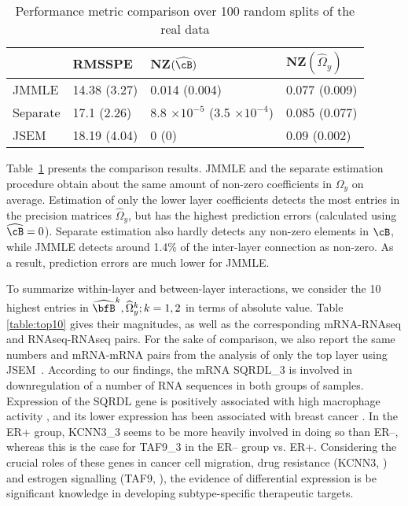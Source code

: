 \begin{table}[t]
\centering
    \begin{tabular}{llll}
    \hline
~        & RMSSPE        & NZ$(\widehat \cB)$  & NZ$(\widehat \Omega_y)$  \\\hline
JMMLE    & 14.38 (3.27) & 0.014 (0.004) & 0.077 (0.009) \\
Separate & 17.1 (2.26)  & 8.8 $\times 10^{-5}$ (3.5 $\times 10^{-4}$) & 0.085 (0.077) \\
JSEM     & 18.19 (4.04) & 0 (0)             & 0.09 (0.002) \\\hline
    \end{tabular}
    \caption{Performance metric comparison over 100 random splits of the real data}
    \label{table:real-compare}
\end{table}
%
Table~\ref{table:real-compare} presents the comparison results. JMMLE and the separate estimation procedure obtain about the same amount of non-zero coefficients in $\Omega_y$ on average. Estimation of only the lower layer coefficients detects the most entries in the precision matrices $\widehat \Omega_y$, but has the highest prediction errors (calculated using $\widehat \cB = 0$). Separate estimation also hardly detects any non-zero elements in $\cB$, while JMMLE detects around 1.4\% of the inter-layer connection as non-zero. As a result, prediction errors are much lower for JMMLE.

To summarize within-layer and between-layer interactions, we consider the 10 highest entries in $\widehat \bfB^k, \widehat \Omega_y^k; k = 1,2$ in terms of absolute value. Table \ref{table:top10} gives their magnitudes, as well as the corresponding mRNA-RNAseq and RNAseq-RNAseq pairs. For the sake of comparison, we also report the same numbers and mRNA-mRNA pairs from the analysis of only the top layer using JSEM~\citep{MaMichailidis15}. According to our findings, the mRNA SQRDL\_3 is involved in downregulation of a number of RNA sequences in both groups of samples. Expression of the SQRDL gene is positively associated with high macrophage activity \citep{LyonsEtal17}, and its lower expression has been associated with breast cancer \citep{LiuEtal07,PiresEtal18}. In the ER+ group, KCNN3\_3 seems to be more heavily involved in doing so than ER--, whereas this is the case for TAF9\_3 in the ER-- group vs. ER+. Considering the crucial roles of these genes in cancer cell migration, drug resistance (KCNN3, \citet{kcnn3}) and estrogen signalling (TAF9, \citet{taf9}), the evidence of differential expression is be significant knowledge in developing subtype-specific therapeutic targets.

